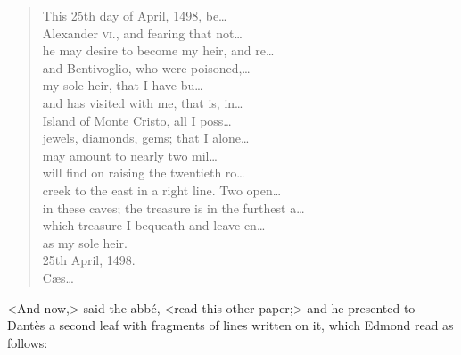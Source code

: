 \begin{a4}
\begin{quotation}\raggedright\oldfont
	This 25th day of April, 1498, be\dots \\      
	Alexander \textsc{vi.}, and fearing that not\dots \\      
	he may desire to become my heir, and re\dots \\      
	and Bentivoglio, who were poisoned,\dots \\      
	my sole heir, that I have bu\dots \\      
	and has visited with me, that is, in\dots \\      
	Island of Monte Cristo, all I poss\dots \\      
	jewels, diamonds, gems; that I alone\dots \\      
	may amount to nearly two mil\dots \\      
	will ﬁnd on raising the twentieth ro\dots \\      
	creek to the east in a right line. Two open\dots \\      
	in these caves; the treasure is in the furthest a\dots \\      
	which treasure I bequeath and leave en\dots \\      
	as my sole heir.\\      
	25th April, 1498.\\      
	Cæs\dots  
 \end{quotation}

\end{a4}

 <And now,> said the abbé, <read this other paper;> and he presented to Dantès a second leaf with fragments of lines written on it, which Edmond read as follows:  
 
